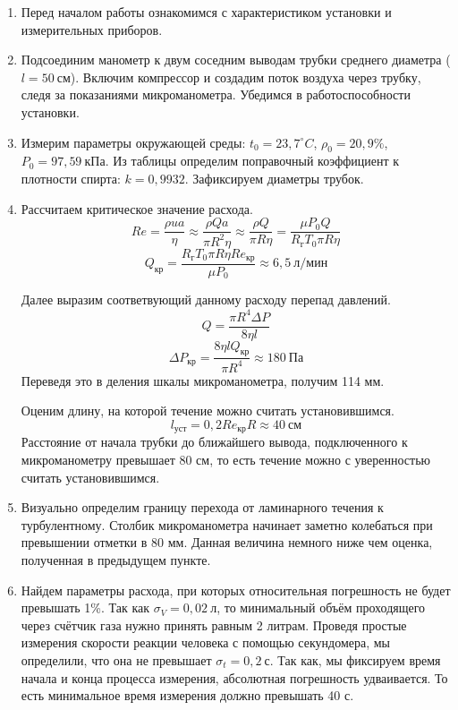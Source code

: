 \documentclass[14pt, a4paper]{report}
\begin{document}
\begin{enumerate}

\item Перед началом работы ознакомимся с характеристиком установки и измерительных приборов.

\item Подсоединим манометр к двум соседним выводам трубки среднего диаметра ($l=50\ см$). Включим компрессор и создадим поток воздуха через трубку, следя за показаниями микроманометра. Убедимся в работоспособности установки.

\item Измерим параметры окружающей среды: $t_0=23,7 ^\circ C$, $\rho_0=20,9\%$, $P_0=97,59\ кПа$. Из таблицы определим поправочный коэффициент к плотности спирта: $k=0,9932$. Зафиксируем диаметры трубок.

\item Рассчитаем критическое значение расхода.
\[Re=\frac{\rho ua}{\eta}\approx\frac{\rho Qa}{\pi R^2\eta}\approx\frac{\rho Q}{\pi R\eta}=\frac{\mu P_0Q}{R_гT_0\pi R\eta}\]
\[Q_{кр}=\frac{R_гT_0\pi R\eta Re_{кр}}{\mu P_0}\approx6,5\ л/мин\]

Далее выразим соответвующий данному расходу перепад давлений.
\[Q=\frac{\pi R^4\Delta P}{8\eta l}\]
\[\Delta P_{кр}=\frac{8\eta lQ_{кр}}{\pi R^4}\approx180\ Па\]
Переведя это в деления шкалы микроманометра, получим 114 мм.

Оценим длину, на которой течение можно считать установившимся.
\[l_{уст}=0,2Re_{кр}R\approx40\ см\]
Расстояние от начала трубки до ближайшего вывода, подключенного к микроманометру превышает 80 см, то есть течение можно с уверенностью считать установившимся.

\item Визуально определим границу перехода от ламинарного течения к турбулентному. Столбик микроманометра начинает заметно колебаться при превышении отметки в 80 мм. Данная величина немного ниже чем оценка, полученная в предыдущем пункте.

\item Найдем параметры расхода, при которых относительная погрешность не будет превышать 1\%.
Так как $\sigma_V=0,02\ л$, то минимальный объём проходящего через счётчик газа нужно принять равным 2 литрам. Проведя простые измерения скорости реакции человека с помощью секундомера, мы определили, что она не превышает $\sigma_t=0,2\ с$. Так как, мы фиксируем время начала и конца процесса измерения, абсолютная погрешность удваивается. То есть минимальное время измерения должно превышать 40 с.


\end{enumerate}
\end{document}
